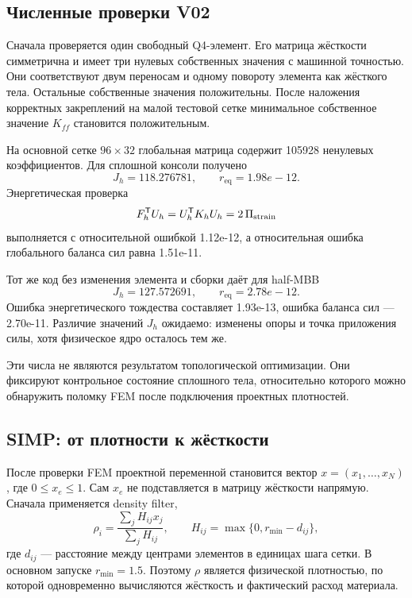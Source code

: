 \subsection{Численные проверки V02}
\label{subsec:practical-v02-checks}

Сначала проверяется один свободный Q4-элемент. Его матрица жёсткости симметрична и имеет три нулевых собственных значения с машинной точностью. Они соответствуют двум переносам и одному повороту элемента как жёсткого тела. Остальные собственные значения положительны. После наложения корректных закреплений на малой тестовой сетке минимальное собственное значение $K_{ff}$ становится положительным.

На основной сетке $96\times32$ глобальная матрица содержит 105928 ненулевых коэффициентов. Для сплошной консоли получено
\begin{equation}
\label{eq:practical-v02-cantilever-result}
 J_h=118.276781,
 \qquad
 r_{\mathrm{eq}}=1.98e-12.
\end{equation}
Энергетическая проверка
\begin{equation}
\label{eq:practical-v02-energy-check}
 F_h^{\mathsf{T}}U_h
 =
 U_h^{\mathsf{T}}K_hU_h
 =
 2\,\Pi_{\mathrm{strain}}
\end{equation}
выполняется с относительной ошибкой 1.12e-12, а относительная ошибка глобального баланса сил равна 1.51e-11.

Тот же код без изменения элемента и сборки даёт для half-MBB
\begin{equation}
\label{eq:practical-v02-mbb-result}
 J_h=127.572691,
 \qquad
 r_{\mathrm{eq}}=2.78e-12.
\end{equation}
Ошибка энергетического тождества составляет 1.93e-13, ошибка баланса сил --- 2.70e-11. Различие значений $J_h$ ожидаемо: изменены опоры и точка приложения силы, хотя физическое ядро осталось тем же.

Эти числа не являются результатом топологической оптимизации. Они фиксируют контрольное состояние сплошного тела, относительно которого можно обнаружить поломку FEM после подключения проектных плотностей.


\subsection{SIMP: от плотности к жёсткости}
\label{subsec:practical-v03-simp}

После проверки FEM проектной переменной становится вектор $x=(x_1,\ldots,x_N)$, где $0\leq x_e\leq1$. Сам $x_e$ не подставляется в матрицу жёсткости напрямую. Сначала применяется density filter,
\begin{equation}
\label{eq:practical-v03-density-filter}
 \rho_i
 =
 \frac{\sum_j H_{ij}x_j}{\sum_j H_{ij}},
 \qquad
 H_{ij}
 =
 \max\{0,r_{\min}-d_{ij}\},
\end{equation}
где $d_{ij}$ --- расстояние между центрами элементов в единицах шага сетки. В основном запуске $r_{\min}=1.5$. Поэтому $\rho$ является физической плотностью, по которой одновременно вычисляются жёсткость и фактический расход материала.

